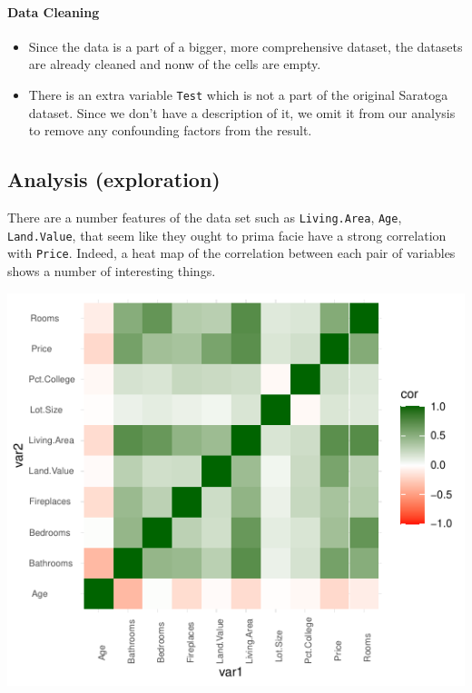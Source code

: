 \documentclass[letterpaper,9pt,twocolumn,twoside,]{pinp}
\begin{document}
\hypertarget{data-cleaning}{%
\paragraph{Data Cleaning}\label{data-cleaning}}

\begin{itemize}
\item
  Since the data is a part of a bigger, more comprehensive dataset, the
  datasets are already cleaned and nonw of the cells are empty.
\item
  There is an extra variable \texttt{Test} which is not a part of the
  original Saratoga dataset. Since we don't have a description of it, we
  omit it from our analysis to remove any confounding factors from the
  result.
\end{itemize}

\hypertarget{analysis-exploration}{%
\subsection{Analysis (exploration)}\label{analysis-exploration}}

There are a number features of the data set such as
\texttt{Living.Area}, \texttt{Age}, \texttt{Land.Value}, that seem like
they ought to prima facie have a strong correlation with \texttt{Price}.
Indeed, a heat map of the correlation between each pair of variables
shows a number of interesting things.

\begin{center}\includegraphics{Final-Report_files/figure-latex/unnamed-chunk-4-1} \end{center}
\end{document}
